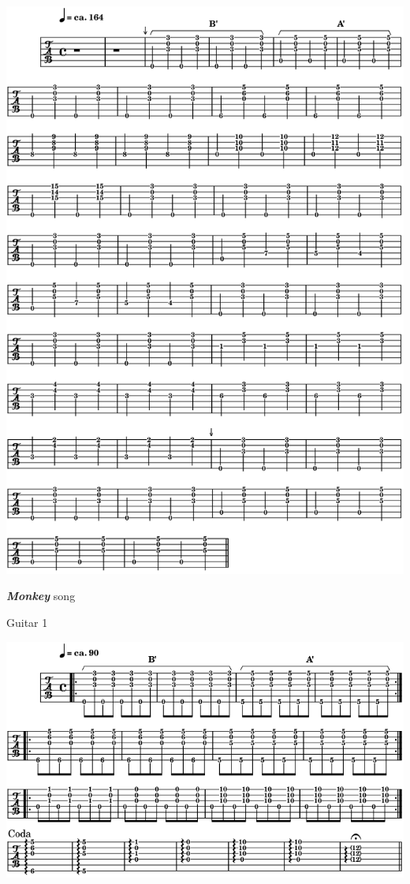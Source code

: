 \begin{center}
\includegraphics[width=\textwidth]{img/neD2}
\end{center}
\newpage

\textbf{\textsl{Monkey}} song  

\bigskip

 \quad Guitar 1

\begin{center}
\includegraphics[width=\textwidth]{img/neE1}
\end{center}


